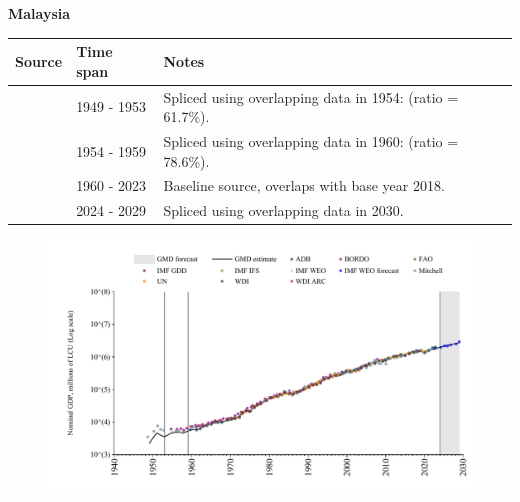 \documentclass[12pt,a4paper,landscape]{article}
\begin{document}
\begin{adjustbox}{max totalsize={\paperwidth}{\paperheight},center}
\begin{minipage}[t][\textheight][t]{\textwidth}
\vspace*{0.5cm}
{}
\begin{center}
{\Large\bfseries Malaysia}
\end{center}
\vspace{0.5cm}
\begin{table}[H]
\centering
\small
\begin{tabular}{|l|l|l|}
\hline
\textbf{Source} & \textbf{Time span} & \textbf{Notes} \\
\hline
\rowcolor{white}\cite{Mitchell}& 1949 - 1953 &Spliced using overlapping data in 1954: (ratio = 61.7\%).\\
\rowcolor{lightgray}\cite{IMF_GDD}& 1954 - 1959 &Spliced using overlapping data in 1960: (ratio = 78.6\%).\\
\rowcolor{white}\cite{WDI}& 1960 - 2023 &Baseline source, overlaps with base year 2018.\\
\rowcolor{lightgray}\cite{IMF_WEO_forecast}& 2024 - 2029 &Spliced using overlapping data in 2030.\\
\hline
\end{tabular}
\end{table}
\begin{figure}[H]
\centering
\includegraphics[width=\textwidth,height=0.6\textheight,keepaspectratio]{graphs/MYS_nGDP.pdf}
\end{figure}
\end{minipage}
\end{adjustbox}
\end{document}
